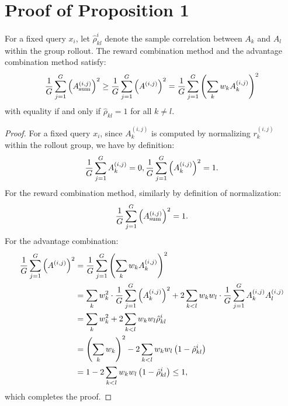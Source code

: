 
\section{Proof of Proposition 1}
\label{appendix:proof_of_proposition_1}

\begin{proposition}
    For a fixed query $x_i$, let $\hat{\rho}_{kl}^i$ denote the sample correlation between $A_k$ and $A_l$ within the group rollout. The reward combination method and the advantage combination method satisfy:
    \begin{align}
        \frac{1}{G} \sum_{j=1}^G \left(A_\text{sum}^{(i,j)}\right)^2 \ge \frac{1}{G} \sum_{j=1}^G \left(A^{(i,j)}\right)^2 = \frac{1}{G} \sum_{j=1}^G \left(\sum_k w_k A_k^{(i,j)}\right)^2 \notag
    \end{align}
    with equality if and only if $\hat{\rho}_{kl}=1$ for all $k \neq l$.
\end{proposition}
\begin{proof}
    For a fixed query $x_i$, since $A_k^{(i,j)}$ is computed by normalizing $r_k^{(i,j)}$ within the rollout group, we have by definition:
    \begin{align}
        \frac{1}{G}\sum_{j=1}^G A_k^{(i,j)} = 0, \frac{1}{G}\sum_{j=1}^G \left( A_k^{(i,j)} \right)^2 = 1.\notag
    \end{align}
    For the reward combination method, similarly by definition of normalization:
    \begin{align}
        \frac{1}{G} \sum_{j=1}^G \left( A_\text{sum}^{(i,j)} \right)^2 = 1.\notag
    \end{align}
    For the advantage combination:
    \begin{align}
        \frac{1}{G} \sum_{j=1}^G \left(A^{(i,j)}\right)^2 &= \frac{1}{G} \sum_{j=1}^G \left(\sum_k w_k A_k^{(i,j)}\right)^2 \notag\\
        &= \sum_k w_k^2 \cdot \frac{1}{G} \sum_{j=1}^G \left( A_k^{(i,j)} \right)^2 + 2 \sum_{k < l} w_k w_l \cdot \frac{1}{G} \sum_{j=1}^G A_k^{(i,j)}A_l^{(i,j)} \notag\\
        &= \sum_k w_k^2 + 2 \sum_{k<l} w_k w_l \hat{\rho}_{kl}^i \notag\\
        &= \left(\sum_k w_k\right)^2 - 2\sum_{k<l} w_k w_l \left(1 - \hat{\rho}_{kl}^i\right) \notag\\
        &= 1 - 2\sum_{k<l} w_k w_l \left(1 - \hat{\rho}_{kl}^i\right) \le 1, \notag
    \end{align}
    which completes the proof.
\end{proof}

